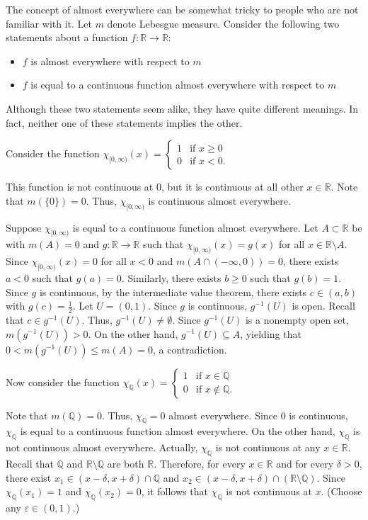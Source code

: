 \documentclass[12pt]{article}
\begin{document}
The concept of almost everywhere can be somewhat tricky to people who are not familiar with it.  Let $m$ denote Lebesgue measure.  Consider the following two statements about a function $f \colon \mathbb{R} \to \mathbb{R}$:

\begin{itemize}
\item $f$ is  almost everywhere with respect to $m$
\item $f$ is equal to a continuous function almost everywhere with respect to $m$
\end{itemize}

Although these two statements seem alike, they have quite different meanings.  In fact, neither one of these statements implies the other.

Consider the function $\chi_{[0, \infty )}(x)=\begin{cases}
1 & \text{if } x \ge 0 \\
0 & \text{if } x<0. \end{cases}$

This function is not continuous at $0$, but it is continuous at all other $x \in \mathbb{R}$.  Note that $m(\{0\})=0$. Thus, $\chi_{[0, \infty )}$ is continuous almost everywhere.

Suppose $\chi_{[0, \infty )}$ is equal to a continuous function almost everywhere.  Let $A \subset \mathbb{R}$ be  with $m(A)=0$ and $g \colon \mathbb{R} \to \mathbb{R}$ such that $\chi_{[0, \infty )}(x)=g(x)$ for all $x \in \mathbb{R} \setminus A$.  Since $\chi_{[0, \infty )}(x)=0$ for all $x<0$ and $m(A \cap (-\infty , 0))=0$, there exists $a<0$ such that $g(a)=0$.  Similarly, there exists $b \ge 0$ such that $g(b)=1$.  Since $g$ is continuous, by the intermediate value theorem, there exists $c \in (a,b)$ with $g(c)=\frac{1}{2}$.  Let $U=(0,1)$.  Since $g$ is continuous, $g^{-1}(U)$ is open.  Recall that $c \in g^{-1}(U)$.  Thus, $g^{-1}(U) \neq \emptyset$.  Since $g^{-1}(U)$ is a nonempty open set, $m(g^{-1}(U))>0$.  On the other hand, $g^{-1}(U) \subseteq A$, yielding that $0<m(g^{-1}(U)) \le m(A)=0$, a contradiction.

Now consider the function $\chi_\mathbb{Q}(x)=\begin{cases}
1 & \text{if } x \in \mathbb{Q} \\
0 & \text{if } x \notin \mathbb{Q}. \end{cases}$

Note that $m(\mathbb{Q})=0$.  Thus, $\chi_\mathbb{Q}=0$ almost everywhere.  Since $0$ is continuous, $\chi_\mathbb{Q}$ is equal to a continuous function almost everywhere.  On the other hand, $\chi_\mathbb{Q}$ is not continuous almost everywhere.  Actually, $\chi_\mathbb{Q}$ is not continuous at any $x \in \mathbb{R}$.  Recall that $\mathbb{Q}$ and $\mathbb{R} \setminus \mathbb{Q}$ are both  $\mathbb{R}$.  Therefore, for every $x \in \mathbb{R}$ and for every $\delta > 0$, there exist $x_1 \in (x-\delta , x+\delta ) \cap \mathbb{Q}$ and $x_2 \in (x-\delta, x+\delta ) \cap (\mathbb{R} \setminus \mathbb{Q})$.  Since $\chi_\mathbb{Q}(x_1)=1$ and $\chi_\mathbb{Q}(x_2)=0$, it follows that $\chi_\mathbb{Q}$ is not continuous at $x$.  (Choose any $\varepsilon \in (0,1)$.)
\end{document}
